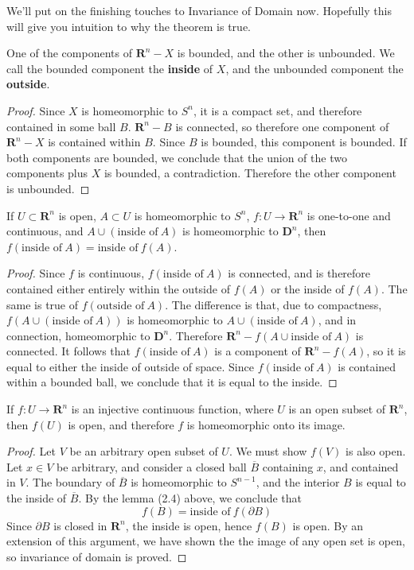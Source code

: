 We'll put on the finishing touches to Invariance of Domain now. Hopefully this will give you intuition to why the theorem is true.

\begin{lemma}
    One of the components of $\mathbf{R}^n - X$ is bounded, and the other is unbounded. We call the bounded component the {\bf inside} of $X$, and the unbounded component the {\bf outside}.
\end{lemma}
\begin{proof}
    Since $X$ is homeomorphic to $S^n$, it is a compact set, and therefore contained in some ball $B$. $\mathbf{R}^n - B$ is connected, so therefore one component of $\mathbf{R}^n - X$ is contained within $B$. Since $B$ is bounded, this component is bounded. If both components are bounded, we conclude that the union of the two components plus $X$ is bounded, a contradiction. Therefore the other component is unbounded.
\end{proof}

\begin{lemma}
    If $U \subset \mathbf{R}^n$ is open, $A \subset U$ is homeomorphic to $S^n$, $f:U \to \mathbf{R}^n$ is one-to-one and continuous, and $A \cup (\text{inside of}\ A)$ is homeomorphic to $\mathbf{D}^n$, then $f(\text{inside of}\ A) = \text{inside of}\ f(A)$.
\end{lemma}
\begin{proof}
    Since $f$ is continuous, $f(\text{inside of}\ A)$ is connected, and is therefore contained either entirely within the outside of $f(A)$ or the inside of $f(A)$. The same is true of $f(\text{outside of}\ A)$. The difference is that, due to compactness, $f(A \cup (\text{inside of}\ A))$ is homeomorphic to $A \cup (\text{inside of}\ A)$, and in connection, homeomorphic to $\mathbf{D}^n$. Therefore $\mathbf{R}^n - f(A \cup \text{inside of}\ A)$ is connected. It follows that $f(\text{inside of}\ A)$ is a component of $\mathbf{R}^n - f(A)$, so it is equal to either the inside of outside of space. Since $f(\text{inside of}\ A)$ is contained within a bounded ball, we conclude that it is equal to the inside.
\end{proof}

\begin{theorem}
    If $f:U \to \mathbf{R}^n$ is an injective continuous function, where $U$ is an open subset of $\mathbf{R}^n$, then $f(U)$ is open, and therefore $f$ is homeomorphic onto its image.
\end{theorem}
\begin{proof}
    Let $V$ be an arbitrary open subset of $U$. We must show $f(V)$ is also open. Let $x \in V$ be arbitrary, and consider a closed ball $\overline{B}$ containing $x$, and contained in $V$. The boundary of $\overline{B}$ is homeomorphic to $S^{n-1}$, and the interior $B$ is equal to the inside of $\overline{B}$. By the lemma (2.4) above, we conclude that
    \[ f(B) = \text{inside of}\ f(\partial B) \]
    Since $\partial B$ is closed in $\mathbf{R}^n$, the inside is open, hence $f(B)$ is open. By an extension of this argument, we have shown the the image of any open set is open, so invariance of domain is proved.
\end{proof}

